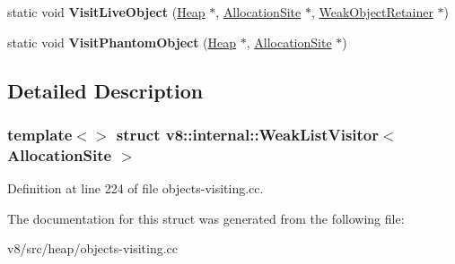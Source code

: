\begin{DoxyCompactItemize}
\mbox{\label{structv8_1_1internal_1_1WeakListVisitor_3_01AllocationSite_01_4_a48d8ab358cd311cef255165feddf430a}} 
static void {\bfseries Visit\+Live\+Object} (\mbox{\hyperlink{classv8_1_1internal_1_1Heap}{Heap}} $\ast$, \mbox{\hyperlink{classv8_1_1internal_1_1AllocationSite}{Allocation\+Site}} $\ast$, \mbox{\hyperlink{classv8_1_1internal_1_1WeakObjectRetainer}{Weak\+Object\+Retainer}} $\ast$)
\item 
\mbox{\label{structv8_1_1internal_1_1WeakListVisitor_3_01AllocationSite_01_4_a795afdf40156d0af54722f2ba82f04dd}} 
static void {\bfseries Visit\+Phantom\+Object} (\mbox{\hyperlink{classv8_1_1internal_1_1Heap}{Heap}} $\ast$, \mbox{\hyperlink{classv8_1_1internal_1_1AllocationSite}{Allocation\+Site}} $\ast$)
\end{DoxyCompactItemize}


\subsection{Detailed Description}
\subsubsection*{template$<$$>$\newline
struct v8\+::internal\+::\+Weak\+List\+Visitor$<$ Allocation\+Site $>$}



Definition at line 224 of file objects-\/visiting.\+cc.



The documentation for this struct was generated from the following file\+:\begin{DoxyCompactItemize}
\item 
v8/src/heap/objects-\/visiting.\+cc\end{DoxyCompactItemize}
